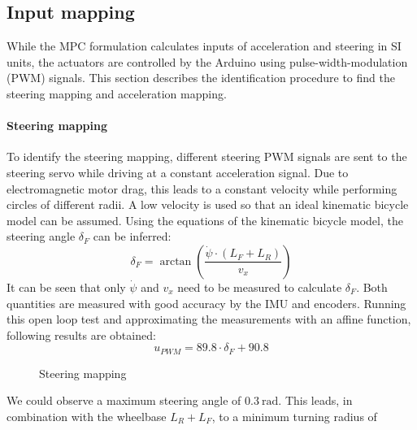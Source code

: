 \subsection{Input mapping}\label{sec:inputMapping}
While the MPC formulation calculates inputs of acceleration and steering in SI units, the actuators are controlled by the Arduino using pulse-width-modulation (PWM) signals. This section describes the identification procedure to find the steering mapping and acceleration mapping.
\paragraph{Steering mapping}%
To identify the steering mapping, different steering PWM signals are sent to the steering servo while driving at a constant acceleration signal. Due to electromagnetic motor drag, this leads to a constant velocity while performing circles of different radii. A low velocity is used so that an ideal kinematic bicycle model can be assumed. Using the equations of the kinematic bicycle model, the steering angle $\delta_F$ can be inferred:
\begin{equation}\label{eq:deltaF}
\delta_F = \arctan\left(\frac{\dot\psi\cdot(L_F+L_R)}{v_x}\right)
\end{equation}
It can be seen that only $\dot \psi$ and $v_x$ need to be measured to calculate $\delta_F$. Both quantities are measured with good accuracy by the IMU and encoders.
Running this open loop test and approximating the measurements with an affine function, following results are obtained:
\begin{equation}
u_{PWM} = 89.8\cdot \delta_F + 90.8
\end{equation}
\begin{figure}[ht]
    \centering
  
    \caption{Steering mapping}
    \label{fig:d_f_mapping}
\end{figure}
We could observe a maximum steering angle of $\SI{0.3}{\radian}$. This leads, in combination with the wheelbase $L_R+L_F$, to a minimum turning radius of

